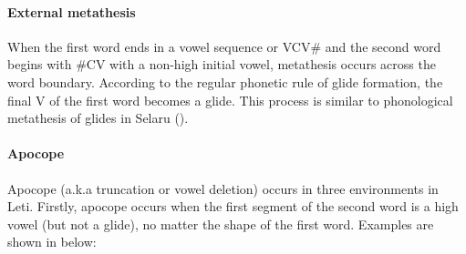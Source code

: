 \begin{exe}
	\label{ex:IntMetVVCV->VVC}
\end{exe}

\paragraph{External metathesis}\label{sec:LetExtMet}
When the first word ends in a vowel sequence or VCV{\#}
and the second word begins with {\#}CV with a non-high
initial vowel, metathesis occurs across the word boundary.
According to the regular phonetic rule of glide formation,
the final V of the first word becomes a glide.
This process is similar to phonological metathesis
of glides in Selaru ().

\begin{exe}
	\label{LetExtMet}
\end{exe}

\paragraph{Apocope}\label{sec:LetApo}
Apocope (a.k.a truncation or vowel deletion) occurs in three environments in Leti.
Firstly, apocope occurs when the first segment of the second word is a high vowel
(but not a glide),
no matter the shape of the first word.
Examples are shown in  below:


